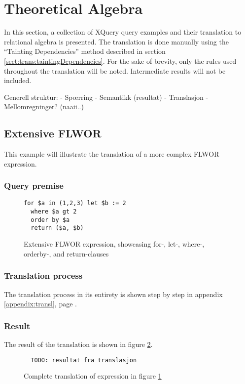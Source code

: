 \section{Theoretical Algebra}
In this section, a collection of XQuery query examples and their translation to
relational algebra is presented. The translation is done manually using the
``Tainting Dependencies'' method described in section
\ref{sect:trans:taintingDependencies}. For the sake of brevity, only the
rules used throughout the translation will be noted. Intermediate results will
not be included.

Generell struktur:
- Sp\oe rring
- Semantikk (resultat)
- Translasjon
- Mellomregninger? (naaii..)

\subsection{Extensive FLWOR}
This example will illustrate the translation of a more complex FLWOR expression.

\subsubsection{Query premise}
\begin{figure}[htp]
\begin{center}
\begin{Verbatim}
for $a in (1,2,3) let $b := 2
  where $a gt 2
  order by $a
  return ($a, $b)
\end{Verbatim}
  \caption{Extensive FLWOR expression, showcasing for-, let-, where-, orderby-,
  and return-clauses}
  \label{fig:results:query_ext_flwor}
\end{center}
\end{figure}

\subsubsection{Translation process}
The translation process in its entirety is shown step by step in appendix
\ref{appendix:transl}, page \pageref{appendix:transl}.

\subsubsection{Result}
The result of the translation is shown in figure
\ref{fig:results:query_ext_flwor_result}.

\begin{figure}[htp]
\begin{center}
  \begin{Verbatim}
  TODO: resultat fra translasjon
  \end{Verbatim}
  \caption{Complete translation of expression in figure
  \ref{fig:results:query_ext_flwor}}
  \label{fig:results:query_ext_flwor_result}
\end{center}
\end{figure}

